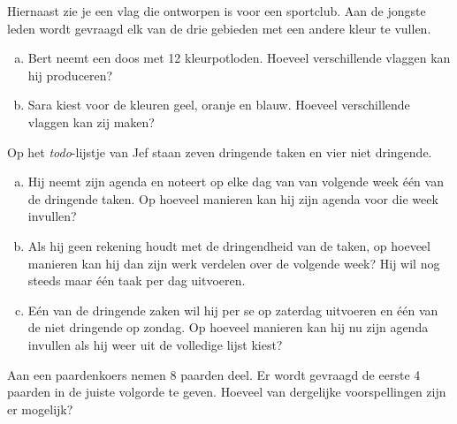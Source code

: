 \documentclass[12pt,twoside]{article}
\begin{document}
\begin{minipage}{0.7\textwidth}
\begin{oefening}
Hiernaast zie je een vlag die ontworpen is voor een sportclub. Aan de jongste leden wordt gevraagd elk van de drie gebieden met een andere kleur te vullen.
\begin{enumerate}[(a)]
  \item Bert neemt een doos met 12 kleurpotloden. Hoeveel verschillende vlaggen kan hij produceren?
  \item Sara kiest voor de kleuren geel, oranje en blauw. Hoeveel verschillende vlaggen kan zij maken?
\end{enumerate}
\end{oefening}
\end{minipage}
\begin{minipage}{0.25\textwidth}
\end{minipage}

\begin{oefening}
Op het {\em todo}-lijstje van Jef staan zeven dringende taken en vier niet dringende.
\begin{enumerate}[(a)]
  \item Hij neemt zijn agenda en noteert op elke dag van van volgende week één van de dringende taken. Op hoeveel manieren kan hij zijn agenda voor die week invullen?
  \item Als hij geen rekening houdt met de dringendheid van de taken, op hoeveel manieren kan hij dan zijn werk verdelen over de volgende week? Hij wil nog steeds maar één taak per dag uitvoeren.
  \item Eén van de dringende zaken wil hij per se op zaterdag uitvoeren en één van de niet dringende op zondag. Op hoeveel manieren kan hij nu zijn agenda invullen als hij weer uit de volledige lijst kiest?
\end{enumerate}
\end{oefening}

\begin{oefening}
Aan een paardenkoers nemen 8 paarden deel. Er wordt gevraagd de eerste 4 paarden in de juiste volgorde te geven. Hoeveel van dergelijke voorspellingen zijn er mogelijk?
\end{oefening}
\end{document}
